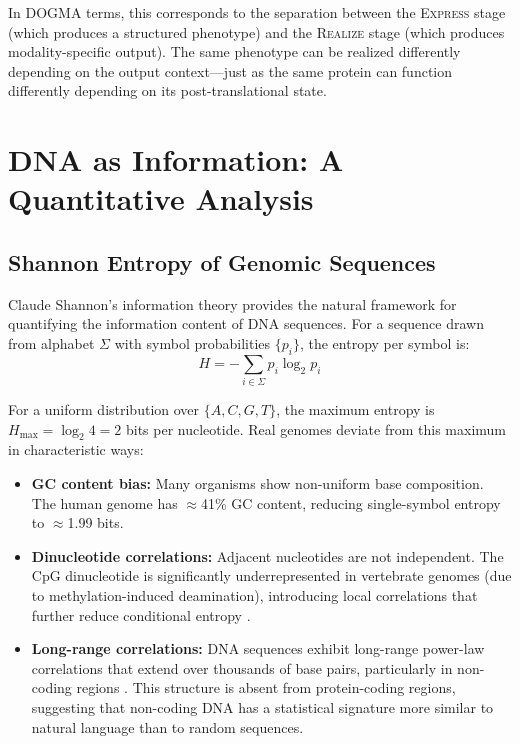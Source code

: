 In DOGMA terms, this corresponds to the separation between the \textsc{Express} stage (which produces a structured phenotype) and the \textsc{Realize} stage (which produces modality-specific output). The same phenotype can be realized differently depending on the output context---just as the same protein can function differently depending on its post-translational state.

\section{DNA as Information: A Quantitative Analysis}
\label{sec:dna-information}

\subsection{Shannon Entropy of Genomic Sequences}

Claude Shannon's information theory \citep{shannon1948} provides the natural framework for quantifying the information content of DNA sequences. For a sequence drawn from alphabet $\Sigma$ with symbol probabilities $\{p_i\}$, the entropy per symbol is:
\begin{equation}
H = -\sum_{i \in \Sigma} p_i \log_2 p_i
\label{eq:shannon-entropy}
\end{equation}

For a uniform distribution over $\{A, C, G, T\}$, the maximum entropy is $H_{\max} = \log_2 4 = 2$ bits per nucleotide. Real genomes deviate from this maximum in characteristic ways:

\begin{itemize}[leftmargin=1.8em]
  \item \textbf{GC content bias:} Many organisms show non-uniform base composition. The human genome has $\approx$41\% GC content, reducing single-symbol entropy to $\approx$1.99 bits.

  \item \textbf{Dinucleotide correlations:} Adjacent nucleotides are not independent. The CpG dinucleotide is significantly underrepresented in vertebrate genomes (due to methylation-induced deamination), introducing local correlations that further reduce conditional entropy \citep{voss1992}.

  \item \textbf{Long-range correlations:} DNA sequences exhibit long-range power-law correlations that extend over thousands of base pairs, particularly in non-coding regions \citep{mantegna1994}. This structure is absent from protein-coding regions, suggesting that non-coding DNA has a statistical signature more similar to natural language than to random sequences.
\end{itemize}


